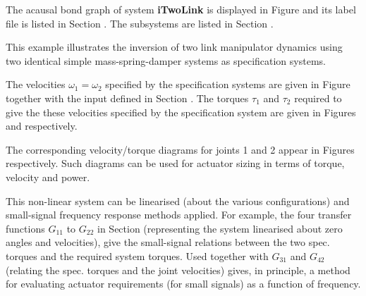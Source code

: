 
%

   The acausal bond graph of system \textbf{iTwoLink} is
   displayed in Figure  and its label
   file is listed in Section .
   The subsystems are listed in Section .

This example illustrates the inversion of  two link manipulator
dynamics using two identical  simple mass-spring-damper systems as
specification systems.

The velocities $\omega_1=\omega_2$ specified by the specification
systems are given in Figure 
together with the input defined in Section .
The torques $\tau_1$ and $\tau_2$ required to give the these
velocities specified by the specification system are given in Figures
 and
 respectively.

The corresponding velocity/torque diagrams for joints 1 and 2 appear in
Figures 
 respectively.
Such diagrams can be used for actuator sizing in terms of torque,
velocity and power.

 
This non-linear system can be linearised (about the various
configurations) and small-signal frequency response methods applied.
For example, the four transfer functions $G_11$ to $G_22$ in Section
 (representing the system linearised about zero
angles and velocities), give the small-signal relations between the
two spec. torques and the required system torques. Used together with
$G_31$ and $G_42$ (relating the spec. torques and the joint
velocities) gives, in principle, a method for evaluating actuator
requirements (for small signals) as a function of frequency.

